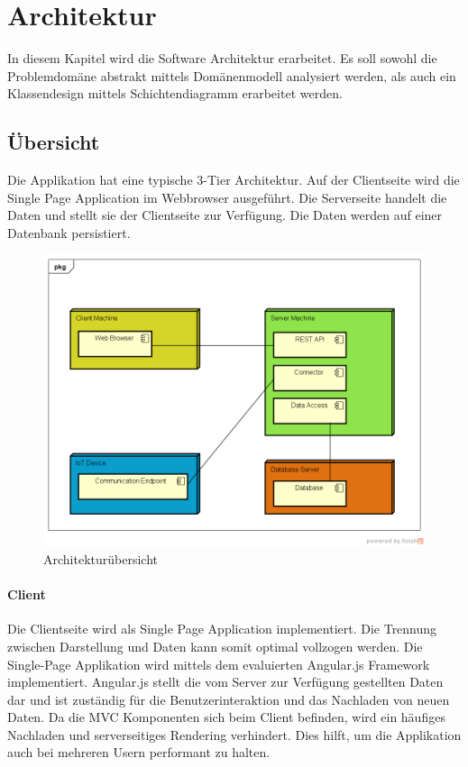  \chapter{Architektur}
In diesem Kapitel wird die Software Architektur erarbeitet.  
Es soll sowohl die Problemdomäne abstrakt mittels Domänenmodell analysiert werden, als auch ein Klassendesign mittels Schichtendiagramm erarbeitet werden.

\section{Übersicht}
Die Applikation hat eine typische 3-Tier Architektur. Auf der Clientseite wird die Single Page Application im Webbrowser ausgeführt. Die Serverseite handelt die Daten und stellt sie der Clientseite zur Verfügung. Die Daten werden auf einer Datenbank persistiert.
\begin{figure}[H]
\center
\includegraphics[scale=0.6]{images/architekturuebersicht}\caption{Architekturübersicht}
\end{figure}
\subsubsection{Client}
Die Clientseite wird als Single Page Application implementiert. Die Trennung zwischen Darstellung und Daten kann somit optimal vollzogen werden. Die Single-Page Applikation wird mittels dem evaluierten Angular.js Framework implementiert. Angular.js stellt die vom Server zur Verfügung gestellten Daten dar und ist zuständig für die Benutzerinteraktion und das Nachladen von neuen Daten. Da die MVC Komponenten sich beim Client befinden, wird ein häufiges Nachladen und serverseitiges Rendering verhindert. Dies hilft, um die Applikation auch bei mehreren Usern performant zu halten.
